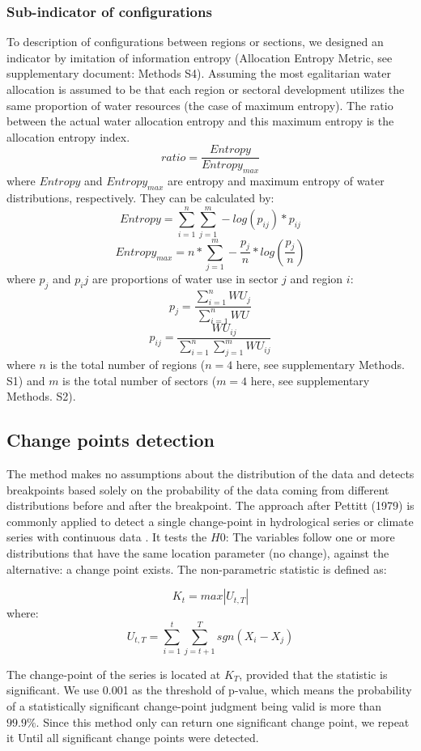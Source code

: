 \documentclass[9pt, twocolumn, twoside, lineno]{pnas-new}
\begin{document}
{	\subsubsection*{Sub-indicator of configurations}
	To description of configurations between regions or sections, we designed an indicator by imitation of information entropy (Allocation Entropy Metric, see supplementary document: Methods S4). Assuming the most egalitarian water allocation is assumed to be that each region or sectoral development utilizes the same proportion of water resources (the case of maximum entropy). The ratio between the actual water allocation entropy and this maximum entropy is the allocation entropy index.
	$$ ratio = \frac{Entropy}{Entropy_{max}} $$
	where $Entropy$ and $Entropy_{max}$ are entropy and maximum entropy of water distributions, respectively. They can be calculated by:
	$$ Entropy = \sum_{i=1}^n \sum_{j=1}^m -log(p_{ij}) * p_{ij} $$
	$$ Entropy_{max} = n * \sum_{j=1}^m -\frac{p_j}{n} * log(\frac{p_j}{n}) $$ 
	where $p_j$ and $p_ij$ are proportions of water use in sector $j$ and region $i$:
	$$ p_j = \frac{\sum_{i=1}^n WU_j}{\sum_{i=1}^n WU} $$
	$$ p_{ij} = \frac{WU_{ij}} {\sum_{i=1}^n \sum_{j=1}^m WU_{ij}} $$
	where $n$ is the total number of regions ($n=4$ here, see supplementary Methods. S1) and $m$ is the total number of sectors ($m=4$ here, see supplementary Methods. S2).

	\subsection*{Change points detection}
		The method makes no assumptions about the distribution of the data and detects breakpoints based solely on the probability of the data coming from different distributions before and after the breakpoint.
		The approach after Pettitt (1979) is commonly applied to detect a single change-point in hydrological series or climate series with continuous data \cite{pettittNonParametricApproachChangePoint1979}. It tests the $H0$: The variables follow one or more distributions that have the same location parameter (no change), against the alternative: a change point exists. The non-parametric statistic is defined as:
	
		$$ K_t = max|U_{t, T}|$$
		where:
		$$ U_{t, T} = \sum_{i=1}^t\sum_{j=t+1}^T sgn(X_i - X_j) $$
	
		The change-point of the series is located at $K_T$, provided that the statistic is significant. We use 0.001 as the threshold of p-value, which means the probability of a statistically significant change-point judgment being valid is more than $99.9\%$. Since this method only can return one significant change point, we repeat it Until all significant change points were detected.
	
}
\end{document}

